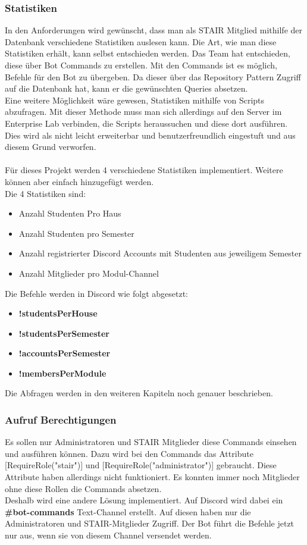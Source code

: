 \documentclass[a4paper, table]{article}
\begin{document}
\subsubsection{Statistiken}
In den Anforderungen wird gewünscht, dass man als STAIR Mitglied mithilfe der Datenbank verschiedene Statistiken auslesen kann. 
Die Art, wie man diese Statistiken erhält, kann selbst entschieden werden. 
Das Team hat entschieden, diese über Bot Commands zu erstellen. 
Mit den Commands ist es möglich, Befehle für den Bot zu übergeben. 
Da dieser über das Repository Pattern Zugriff auf die Datenbank hat, kann er die gewünschten Queries absetzen.\\
Eine weitere Möglichkeit wäre gewesen, Statistiken mithilfe von Scripts abzufragen. 
Mit dieser Methode muss man sich allerdings auf den Server im Enterprise Lab verbinden, die Scripts heraussuchen und diese dort ausführen. 
Dies wird als nicht leicht erweiterbar und benutzerfreundlich eingestuft und aus diesem Grund verworfen.\\\\
Für dieses Projekt werden 4 verschiedene Statistiken implementiert. 
Weitere können aber einfach hinzugefügt werden. \\
Die 4 Statistiken sind:
\begin{itemize}
    \item Anzahl Studenten Pro Haus
    \item Anzahl Studenten pro Semester
    \item Anzahl registrierter Discord Accounts mit Studenten aus jeweiligem Semester
    \item Anzahl Mitglieder pro Modul-Channel
\end{itemize}
Die Befehle werden in Discord wie folgt abgesetzt:
\begin{itemize}
    \item \textbf{!studentsPerHouse}
    \item \textbf{!studentsPerSemester}
    \item \textbf{!accountsPerSemester}
    \item \textbf{!membersPerModule}
\end{itemize}
Die Abfragen werden in den weiteren Kapiteln noch genauer beschrieben.

\subsubsection*{Aufruf Berechtigungen}
Es sollen nur Administratoren und STAIR Mitglieder diese Commands einsehen und ausführen können. 
Dazu wird bei den Commands das Attribute [RequireRole("stair")] und [RequireRole("administrator")] gebraucht. 
Diese Attribute haben allerdings nicht funktioniert. 
Es konnten immer noch Mitglieder ohne diese Rollen die Commands absetzen.\\
Deshalb wird eine andere Lösung implementiert. 
Auf Discord wird dabei ein \textbf{\#bot-commands} Text-Channel erstellt. 
Auf diesen haben nur die Administratoren und STAIR-Mitglieder Zugriff. 
Der Bot führt die Befehle jetzt nur aus, wenn sie von diesem Channel versendet werden.
\end{document}

